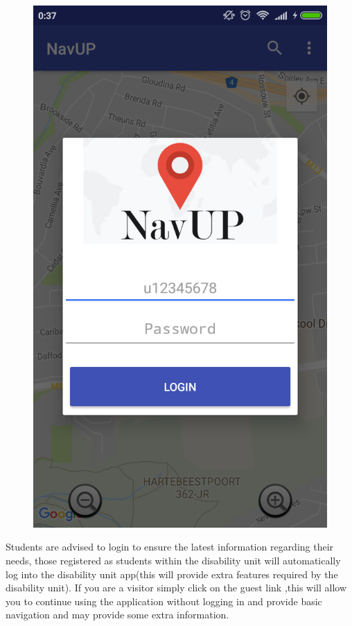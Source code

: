 \documentclass{article}
\begin{document}
\begin{figure}[h!]
\centering
\includegraphics[scale=0.15]{login.png}
\end{figure}

Students are advised to login to ensure the latest information regarding their needs, those registered as students within the disability unit will automatically log into the disability unit app(this will provide extra features required by the disability unit). If you are a visitor simply click on the guest link ,this will allow you to continue using the application without logging in and provide basic navigation and may provide some extra information. 
\end{document}
